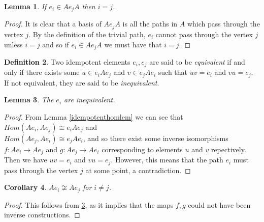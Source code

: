 \documentclass[11.5pt, twoside, a4paper, titlepage]{report}
\theoremstyle{definition}
\newtheorem{mydef}{Definition}[section]
\theoremstyle{plain}
\newtheorem{lem}[mydef]{Lemma}
\newtheorem{cor}[mydef]{Corollary}
\begin{document}
\begin{lem} \label{idempotentsi=jlem}
If $e_i \in Ae_jA$ then $i=j$.
\end{lem}
\begin{proof}
It is clear that a basis of $Ae_jA$ is all the paths in $A$ which pass through the vertex $j$. By the definition of the trivial path, $e_i$ cannot pass through the vertex $j$ unless $i=j$ and so if $e_i \in Ae_jA$ we must have that $i=j$.
\end{proof}

\begin{mydef}
Two idempotent elements $e_i, e_j$ are said to be \emph{equivalent} if and only if there exists some $u\in e_iAe_j$ and $v \in e_jAe_i$ such that $uv=e_i$ and $vu=e_j$. If not equivalent, they are said to be \emph{inequivalent}.
\end{mydef}

\begin{lem}\label{inequivalentlem}
The $e_i$ are inequivalent.
\end{lem}
\begin{proof}
From Lemma \ref{idempotenthomlem} we can see that $Hom(Ae_i, Ae_j)\cong e_iAe_j$ and \\$Hom(Ae_j, Ae_i) \cong e_jAe_i$, and so there exist some inverse isomorphisms $f: Ae_i \to Ae_j$ and $g: Ae_j \to Ae_i$ corresponding to elements $u$ and $v$ repectively. Then we have $uv=e_i$ and $vu=e_j$. However, this means that the path $e_i$ must pass through the vertex $j$ at some point, a contradiction.
\end{proof}

\begin{cor}
$Ae_i \not\cong Ae_j$ for $i \neq j$.
\end{cor}
\begin{proof}
This follows from \ref{inequivalentlem}, as it implies that the maps $f,g$ could not have been inverse constructions.
\end{proof}
\end{document}
